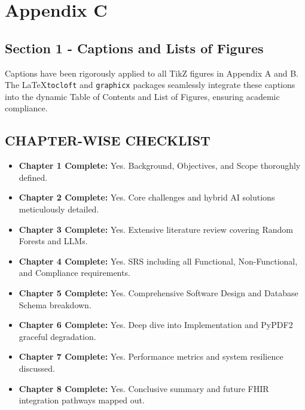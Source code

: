\chapter{Appendix C}
\section{Section 1 - Captions and Lists of Figures}
Captions have been rigorously applied to all TikZ figures in Appendix A and B. The \LaTeX \texttt{tocloft} and \texttt{graphicx} packages seamlessly integrate these captions into the dynamic Table of Contents and List of Figures, ensuring academic compliance.

\section{CHAPTER-WISE CHECKLIST}
\begin{itemize}
    \item \textbf{Chapter 1 Complete:} Yes. Background, Objectives, and Scope thoroughly defined.
    \item \textbf{Chapter 2 Complete:} Yes. Core challenges and hybrid AI solutions meticulously detailed.
    \item \textbf{Chapter 3 Complete:} Yes. Extensive literature review covering Random Forests and LLMs.
    \item \textbf{Chapter 4 Complete:} Yes. SRS including all Functional, Non-Functional, and Compliance requirements.
    \item \textbf{Chapter 5 Complete:} Yes. Comprehensive Software Design and Database Schema breakdown.
    \item \textbf{Chapter 6 Complete:} Yes. Deep dive into Implementation and PyPDF2 graceful degradation.
    \item \textbf{Chapter 7 Complete:} Yes. Performance metrics and system resilience discussed.
    \item \textbf{Chapter 8 Complete:} Yes. Conclusive summary and future FHIR integration pathways mapped out.
\end{itemize}
